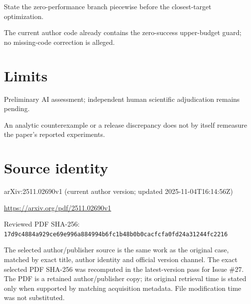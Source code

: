 \documentclass[11pt]{article}
\begin{document}
State the zero-performance branch piecewise before the closest-target optimization.

The current author code already contains the zero-success upper-budget guard; no missing-code correction is alleged.

\section*{Limits}

Preliminary AI assessment; independent human scientific adjudication remains pending.\par

An analytic counterexample or a release discrepancy does not by itself remeasure the paper’s reported experiments.\par

\section*{Source identity}

arXiv:2511.02690v1 (current author version; updated 2025-11-04T16:14:56Z)

\url{https://arxiv.org/pdf/2511.02690v1}

Reviewed PDF SHA-256: \nolinkurl{17d9c4884a929ce69e996a884994b6fc1b48b0b0cacfcfa0fd24a31244fc2216}

The selected author/publisher source is the same work as the original case, matched by exact title, author identity and official version channel. The exact selected PDF SHA-256 was recomputed in the latest-version pass for Issue \#27. The PDF is a retained author/publisher copy; its original retrieval time is stated only when supported by matching acquisition metadata. File modification time was not substituted.
\end{document}
